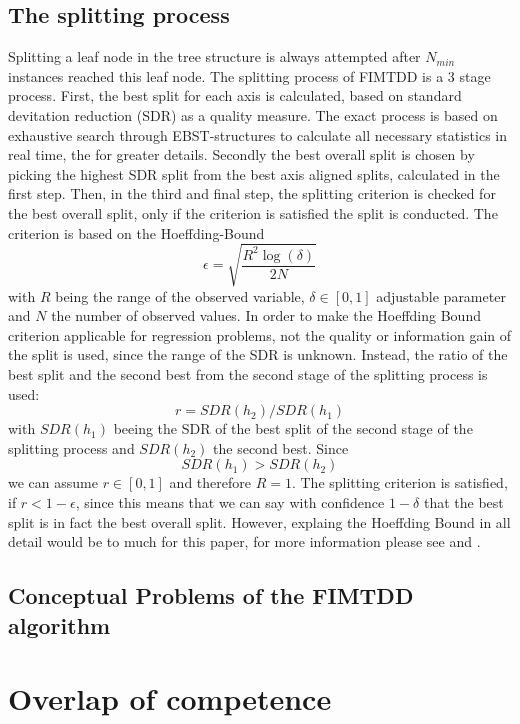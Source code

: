 \documentclass[a4paper,pt12]{article}
\begin{document}
\subsection{The splitting process}
Splitting a leaf node in the tree structure is always attempted after $N_{min}$ instances reached this leaf node. The splitting process of FIMTDD is a 3 stage process. First, the best split for each axis is calculated, based on standard devitation reduction (SDR) as a quality measure. The exact process is based on exhaustive search through EBST-structures to calculate all necessary statistics in real time, the \cite{fimtdd} for greater details. \newline
Secondly the best overall split is chosen by picking the highest SDR split from the best axis aligned splits, calculated in the first step. \newline
Then, in the third and final step, the splitting criterion is checked for the best overall split, only if the criterion is satisfied the split is conducted. \newline
The criterion is based on the Hoeffding-Bound $$\epsilon = \sqrt{\frac{R^2\log(\delta)}{2N}} $$ 
with $R$ being the range of the observed variable, $\delta \in [0,1]$ adjustable parameter and $N$ the number of observed values. In order to make the Hoeffding Bound criterion applicable for regression problems, not the quality or information gain of the split is used, since the range of the SDR is unknown. Instead, the ratio of the best split and the second best from the second stage of the splitting process is used: $$r = SDR(h_{2}) / SDR(h_{1})$$
with $SDR(h_{1})$ beeing the SDR of the best split of the second stage of the splitting process and $SDR(h_{2})$ the second best. Since $$SDR(h_{1}) > SDR(h_{2})$$  we can assume $r \in [0,1]$ and therefore $R = 1$. The splitting criterion is satisfied, if $r < 1-\epsilon$, since this means that we can say with confidence $1-\delta$ that the best split is in fact the best overall split. However, explaing the Hoeffding Bound in all detail would be to much for this paper, for more information please see \cite{fimtdd} and \cite{miningHulten}.
 

\subsection{Conceptual Problems of the FIMTDD  algorithm}



\section{Overlap of competence}
\end{document}
